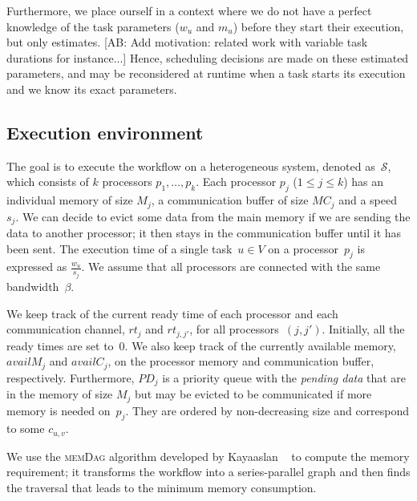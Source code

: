 \documentclass[conference]{IEEEtran}
\newcommand{\algo}[1]{\textsc{#1}}
\newcommand{\cluster}{\,\mathcal{S}}
\newcommand{\MM}{M}
\newcommand{\rt}{rt}
\newcommand{\PD}{PD}
\newcommand{\AB}[1]{{\color{purple}[AB: #1]}}
\begin{document}
Furthermore, we place ourself in a context where we do not have a perfect knowledge
of the task parameters ($w_u$ and $m_u$) before they start their execution,
but only estimates. \AB{Add motivation: related work with variable task durations for instance...}
Hence, scheduling decisions are made on these estimated parameters, and
may be reconsidered at runtime when a task starts its execution and we know
its exact parameters.


    \subsection{Execution environment}
    \label{sec.mod.plat}

    The goal is to execute the workflow on a heterogeneous system, denoted as $\cluster$, which
    consists of $k$ processors $p_1, \dots, p_k$.
    Each processor $p_j$ ($1 \leq j \leq k$) has an individual memory of size $M_j$, a communication
    buffer of size $MC_j$ and a speed~$s_j$.
    We can decide to evict some data from the main memory if we are sending the data
    to another processor; it then stays in the communication buffer until it has been sent.
    The execution time of a single task~$u\in V$ on a processor~$p_j$ is expressed as $\frac{w_u}{s_j}$.
    We assume that all processors are connected with the same bandwidth~$\beta$.

    We keep track of the current ready time of each processor and each communication
    channel, $\rt_j$ and $\rt_{j,j'}$, for all processors~$(j,j')$.
    Initially, all the ready times are set to~$0$.
    We also keep track of the currently available memory, $availM_j$ and $availC_j$,
    on the processor memory and communication buffer, respectively.
    Furthermore, $\PD_j$ is a priority queue with the {\em pending data}
    that are in the memory of size $\MM_j$ but may be evicted to be communicated if
    more memory is needed on~$p_j$. They are ordered by non-decreasing size and
    correspond to some $c_{u,v}$.

    We use the \algo{memDag} algorithm developed by Kayaaslan \etal~\cite{KAYAASLAN20181} to compute
    the memory requirement; it transforms the workflow into a series-parallel graph
    and then finds the traversal that leads to the minimum memory consumption.
\end{document}
